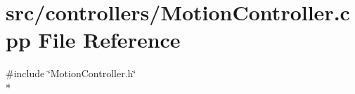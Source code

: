 \section{src/controllers/\-Motion\-Controller.cpp File Reference}
\label{_motion_controller_8cpp}
{\ttfamily \#include \char`\"{}Motion\-Controller.\-h\char`\"{}}\\*
